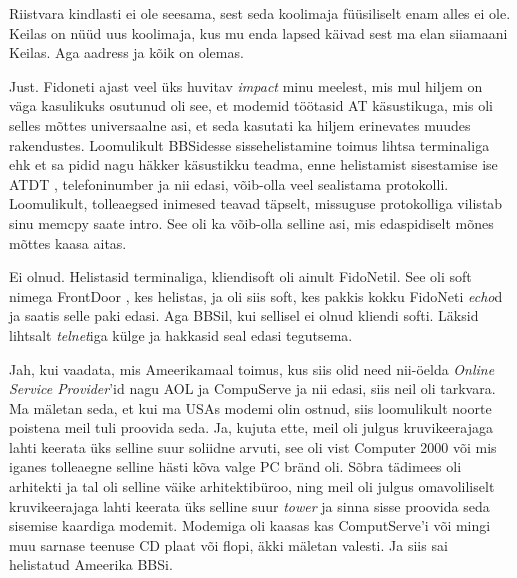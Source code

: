 
Riistvara kindlasti ei ole seesama, sest seda koolimaja füüsiliselt enam alles ei ole. Keilas on nüüd uus koolimaja, kus mu enda lapsed käivad sest ma elan siiamaani Keilas. Aga aadress ja kõik on olemas.


Just. Fidoneti ajast veel üks huvitav \emph{impact} minu meelest, mis mul  hiljem on väga kasulikuks osutunud oli see, et modemid töötasid AT käsustikuga, mis oli selles mõttes universaalne asi, et seda kasutati ka hiljem erinevates muudes rakendustes. Loomulikult BBSidesse sissehelistamine toimus lihtsa terminaliga ehk et sa pidid nagu häkker käsustikku teadma, enne helistamist sisestamise ise ATDT , telefoninumber ja nii edasi, võib-olla veel sealistama protokolli. Loomulikult, tolleaegsed inimesed teavad täpselt, missuguse protokolliga vilistab sinu memcpy saate intro. See oli ka võib-olla selline asi, mis edaspidiselt  mõnes mõttes kaasa aitas.

Ei olnud. Helistasid terminaliga, kliendisoft  oli ainult FidoNetil. See oli soft nimega FrontDoor , kes helistas, ja oli siis soft, kes  pakkis kokku FidoNeti \emph{echo}d ja  saatis  selle paki edasi. Aga BBSil, kui sellisel ei olnud kliendi softi. Läksid lihtsalt \emph{telnet}iga külge ja hakkasid seal edasi tegutsema.


Jah, kui vaadata, mis Ameerikamaal toimus, kus siis olid need nii-öelda \emph{Online Service Provider}'id  nagu AOL ja CompuServe ja nii edasi, siis neil oli tarkvara. Ma mäletan seda, et kui ma USAs modemi  olin ostnud, siis loomulikult noorte poistena meil tuli proovida seda. Ja, kujuta ette, meil oli julgus kruvikeerajaga lahti keerata üks selline suur soliidne arvuti, see oli vist Computer 2000 või mis iganes tolleaegne  selline hästi kõva valge PC bränd oli. Sõbra tädimees oli arhitekti ja tal oli selline väike arhitektibüroo,  ning meil oli julgus  omavoliliselt kruvikeerajaga  lahti keerata üks selline suur \emph{tower} ja sinna sisse proovida seda sisemise kaardiga modemit. Modemiga oli kaasas kas ComputServe'i või mingi muu sarnase teenuse CD plaat või flopi, äkki mäletan valesti. Ja siis sai helistatud Ameerika BBSi.  

